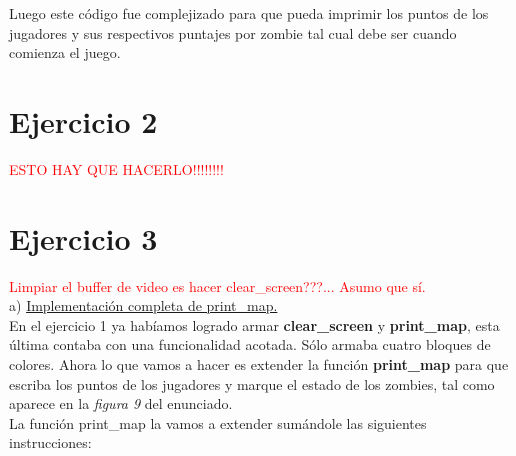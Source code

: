 \documentclass[a4paper]{article}
\begin{document}
Luego este c\'odigo fue complejizado para que pueda imprimir los puntos de los jugadores y sus respectivos puntajes por zombie tal cual debe ser cuando comienza el juego.
\newpage
\section{Ejercicio 2}
\textcolor{red}{ESTO HAY QUE HACERLO!!!!!!!!} \\





%

\newpage
\section{Ejercicio 3}
\textcolor{red}{Limpiar el buffer de video es hacer clear_screen???... Asumo que s\'i.}\\


{\large a)} \underline{Implementaci\'on completa de print_map.} \\

En el ejercicio 1 ya hab\'iamos logrado armar \textbf{clear_screen} y \textbf{print_map}, esta \'ultima contaba con una funcionalidad acotada. S\'olo armaba cuatro bloques de colores. Ahora lo que vamos a hacer es extender la funci\'on \textbf{print_map} para que escriba los puntos de los jugadores y marque el estado de los zombies, tal como aparece en la \textit{figura 9} del enunciado.\\


La funci\'on print_map la vamos a extender sum\'andole las siguientes instrucciones:
\end{document}

